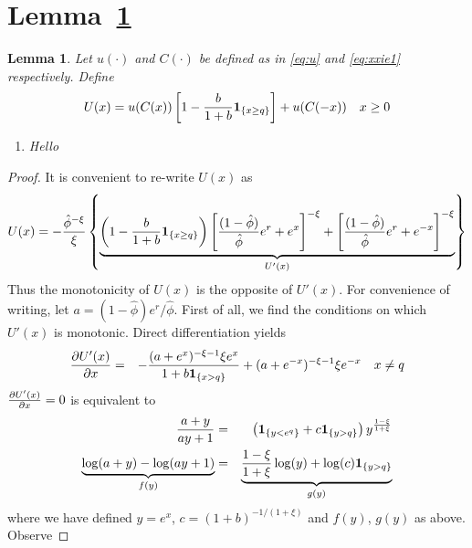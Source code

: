 \documentclass[11pt,a4]{amsart}
\newcommand{\pd}{\partial}
\newtheorem{lemma}{Lemma}[section]
\newcommand{\1}{{\mathbf 1}}
\begin{document}
\section{Lemma~\ref{lemma:III}}
\begin{lemma}\label{lemma:III}
Let $u(\cdot)$  and $C(\cdot)$ be defined as in \eqref{eq:u} and \eqref{eq:xxie1} respectively. Define
\[
U(x) =
u(C(x)) \left[
  1 - {b \over 1 + b}\1_{\{x \ge q\}}
  \right]
+ u(C(-x))
\quad
x \geq 0
\]
\begin{enumerate}
\item  Hello
\end{enumerate}
\end{lemma}
\begin{proof}
  It is convenient to re-write $U(x)$ as
  \[
  U(x) = 
  -{\hat\phi^{-\xi} \over \xi} \left\{
    \underbrace{
    \left(1 - {b \over 1 + b}\1_{\{x \ge q\}}\right)
    \left[{(1 - \hat\phi) \over \hat\phi} e^r + e^x\right]^{-\xi}
    +
    \left[{(1 - \hat\phi) \over \hat\phi} e^r + e^{-x}\right]^{-\xi}
  }_{U'(x)}
\right\}
\]
  Thus the monotonicity of $U(x)$ is the opposite of $U'(x)$. For
  convenience of writing, let $a = (1 - \hat\phi)e^r/\hat\phi$.
  First of all, we find the conditions on which $U'(x)$ is monotonic.
  Direct differentiation yields
  \begin{eqnarray*}
    {\pd U'(x) \over \pd x}
    &=&
    -{
      (a + e^x)^{-\xi - 1} \xi e^x
      \over
      1 + b \1_{\{x > q\}}
    } + (a + e^{-x})^{-\xi - 1} \xi e^{-x}
    \quad
    x \neq q
  \end{eqnarray*}
  ${\pd U'(x) \over \pd x} = 0$ is equivalent to
  \begin{eqnarray*}
    {a + y \over a y + 1} &=& 
    \left( \1_{\{y < e^q\}} + c \1_{\{y > q\}} \right)
    y^{1 -\xi \over 1+\xi} \\
    \underbrace{\log(a + y) - \log(a y + 1)}_{f(y)} &=& \underbrace{{1
        -\xi \over 1+\xi} \log(y)
      + \log(c)\1_{\{y > q\}} }_{g(y)} 
  \end{eqnarray*}
  where we have defined $y = e^x$, $c = (1 + b)^{-1/(1 + \xi)}$ and
  $f(y)$, $g(y)$ as above. Observe

\end{proof}
\end{document}
